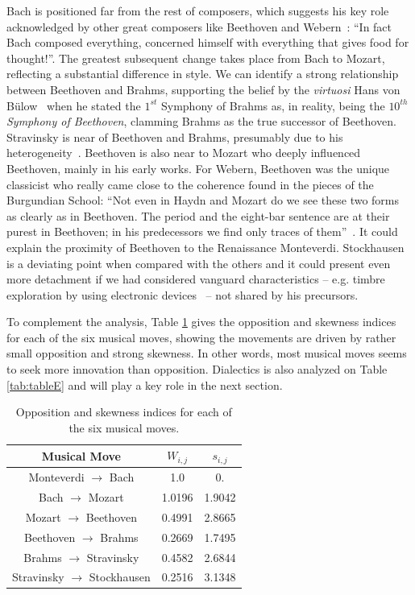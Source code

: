 \documentclass[
 aip,
 jmp,
 amsmath,amssymb,
 reprint,
]{revtex4-1}
\begin{document}
Bach is positioned far from the rest of
composers, which suggests his key role
acknowledged by other great composers like Beethoven and
Webern~\cite{Webern}: ``In fact Bach composed everything, concerned
himself with everything that gives food for thought!''. 
The greatest subsequent change takes place from Bach to Mozart,
reflecting a substantial difference in style.
We can identify a strong relationship between
Beethoven and Brahms, supporting the belief by the \textit{virtuosi} Hans von B\"{u}low~\cite{Bulow} when he
stated the $1^{st}$ Symphony of Brahms as, in reality, being the \textit{$10^{th}$ Symphony of
Beethoven}, clamming Brahms as the true successor of
Beethoven. Stravinsky is near of Beethoven and Brahms,
presumably due to his heterogeneity~\cite{BennettHistory,
  Lovelock}. Beethoven is also near to Mozart who deeply influenced
Beethoven, mainly in his early works.
For Webern, Beethoven was the unique classicist who really came close
to the coherence found in the pieces of the Burgundian School: ``Not even
in Haydn and Mozart do we see these two forms as clearly as in
Beethoven. The period and the eight-bar sentence are at their purest
in Beethoven; in his predecessors we find only traces of them''~\cite{Webern}. It
could explain the proximity of Beethoven to the Renaissance  Monteverdi.
Stockhausen is a deviating point when compared with the others and it
could present even more detachment if we had considered
vanguard characteristics -- e.g. timbre exploration by using
electronic devices~\cite{Lovelock} -- not
shared by his precursors.

To complement the analysis, Table \ref{tab:tableOI} gives the
opposition and skewness indices for each of the six musical moves,
showing the movements are driven by rather small opposition and strong
skewness. In other words, most musical moves seems to seek more innovation
than opposition. Dialectics is also analyzed on Table
\ref{tab:tableE} and will play a key role in the next section.

\begin{table}[ht]
\caption{\label{tab:tableOI}Opposition and skewness indices for each
of the six musical moves.}

\begin{tabular}{|c||c|c|}
\hline
Musical Move & $W_{i,j}$ & $s_{i,j}$ \\
\hline \hline

 Monteverdi $\to$ Bach             &   1.0     &  0.      \\
 Bach $\to$ Mozart                 &   1.0196  &  1.9042  \\
 Mozart $\to$ Beethoven            &   0.4991  &  2.8665  \\
 Beethoven $\to$ Brahms            &   0.2669  &  1.7495  \\
 Brahms $\to$ Stravinsky           &   0.4582  &  2.6844  \\
 Stravinsky $\to$ Stockhausen      &   0.2516  &  3.1348  \\

\hline
\end{tabular}
\end{table}
\end{document}
